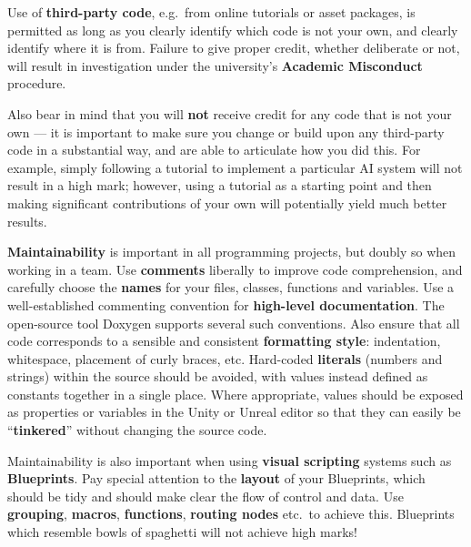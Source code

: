 \documentclass{../../fal_assignment}
\begin{document}
Use of \textbf{third-party code}, e.g.\ from online tutorials or asset packages,
is permitted as long as you clearly identify which code is not your own, and clearly identify where it is from.
Failure to give proper credit, whether deliberate or not, will result in investigation under the university's \textbf{Academic Misconduct} procedure.

Also bear in mind that you will \textbf{not} receive credit for any code that is not your own ---
it is important to make sure you change or build upon any third-party code in a substantial way,
and are able to articulate how you did this.
For example, simply following a tutorial to implement a particular AI system will not result in a high mark;
however, using a tutorial as a starting point and then making significant contributions of your own will potentially yield much better results.

\textbf{Maintainability} is important in all programming projects,
but doubly so when working in a team.
Use \textbf{comments} liberally to improve code comprehension,
and carefully choose the \textbf{names} for your files, classes, functions and variables.
Use a well-established commenting convention
for \textbf{high-level documentation}.
The open-source tool Doxygen supports several such conventions.
Also ensure that all code corresponds to a sensible and consistent \textbf{formatting style}:
indentation, whitespace, placement of curly braces, etc.
Hard-coded \textbf{literals} (numbers and strings) within the source should be avoided,
with values instead defined as constants together in a single place.
Where appropriate, values should be exposed as properties or variables in the Unity or Unreal editor
so that they can easily be ``\textbf{tinkered}'' without changing the source code.

Maintainability is also important when using \textbf{visual scripting} systems such as \textbf{Blueprints}.
Pay special attention to the \textbf{layout} of your Blueprints,
which should be tidy and should make clear the flow of control and data.
Use \textbf{grouping}, \textbf{macros}, \textbf{functions}, \textbf{routing nodes} etc.\ to achieve this.
Blueprints which resemble bowls of spaghetti will not achieve high marks!

\end{document}
